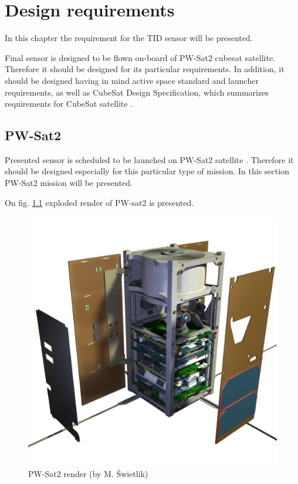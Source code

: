 \chapter{Design requirements}
\label{Design_requirements}

In this chapter the requirement for the TID sensor will be presented.

Final sensor is designed to be flown on-board of PW-Sat2 cubesat satellite. Therefore it should be designed for its particular requirements. In addition, it should be designed having in mind active space standard and launcher requirements, as well as CubeSat Design Specification, which summarizes requirements for CubeSat satellite \cite{CDS}.


\section{PW-Sat2}
    Presented sensor is scheduled to be launched on PW-Sat2 satellite \cite{PW-Sat2URL}. Therefore it should be designed especially for this particular type of mission. In this section PW-Sat2 mission will be presented.

    On fig. \ref{PW-Sat_render_01} exploded render of PW-sat2 is presented.

    \begin{figure}[h]
        \centering
        \includegraphics[width=0.5\paperwidth]{img/04/PW-Sat2_render_01.png}
        \caption{PW-Sat2 render (by M. Świetlik)}
        \label{PW-Sat_render_01}
    \end{figure}

